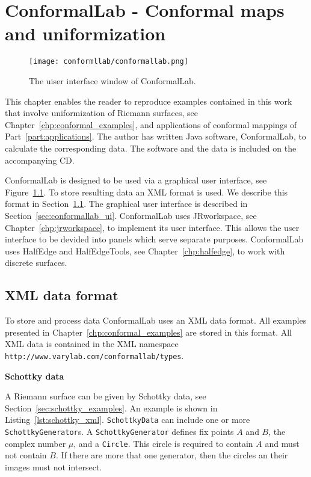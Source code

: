\documentclass[Thesis.tex]{subfiles}
\begin{document}
\chapter{{\sc ConformalLab} - Conformal maps and uniformization}
\label{chp:conformallab}

\begin{figure}
\centering
\texttt{[image: conformllab/conformallab.png]}
\caption{The uiser interface window of {\sc ConformalLab}.}
\label{fig:conformal_window}
\end{figure}

This chapter enables the reader to reproduce examples contained in this work
that involve uniformization of Riemann surfaces, see
Chapter~\ref{chp:conformal_examples}, and applications of conformal mappings of
Part~\ref{part:applications}. The author has written {\sc Java} software, {\sc
ConformalLab}, to calculate the corresponding data.  The software and the data
is included on the accompanying CD. 

{\sc ConformalLab} is designed to be used via a graphical user interface, see
Figure~\ref{fig:conformal_window}. To store resulting data an XML format is
used. We describe this format in Section~\ref{sec:conformal_data}. The
graphical user interface is described in Section~\ref{sec:conformallab_ui}.
{\sc ConformalLab} uses {\sc JRworkspace}, see Chapter~\ref{chp:jrworkspace},
to implement its user interface. This allows the user interface to be devided
into panels which serve separate purposes.  {\sc ConformalLab} uses {\sc
HalfEdge} and {\sc HalfEdgeTools}, see Chapter~\ref{chp:halfedge}, to work with
discrete surfaces.


\section{XML data format}
\label{sec:conformal_data}
To store and process data {\sc ConformalLab} uses an {\sc XML} data format.
All examples presented in Chapter~\ref{chp:conformal_examples} are stored in
this format.  All XML data is contained in the XML namespace {\tt
http://www.varylab.com/conformallab/types}.


{\bf Schottky data} 

A Riemann surface can be given by Schottky data, see
Section~\ref{sec:schottky_examples}. An example is shown in
Listing~\ref{lst:schottky_xml}. {\tt SchottkyData} can include one or more {\tt
SchottkyGenerator}s. A {\tt SchottkyGenerator} defines fix points $A$ and
$B$, the complex number $\mu$, and a {\tt Circle}. This circle is required to
contain $A$ and must not contain $B$. If there are more that one generator,
then the circles an their images must not intersect.
\end{document}
